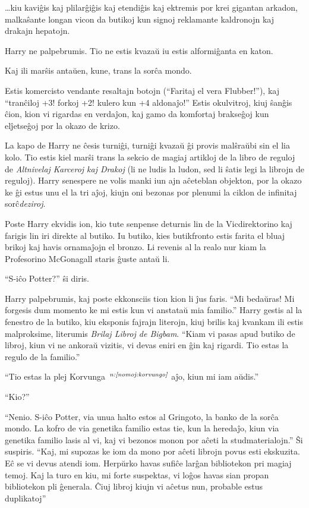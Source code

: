 \ldots kiu kaviĝis kaj plilarĝiĝis kaj etendiĝis kaj ektremis por
krei gigantan arkadon, malkaŝante longan vicon da butikoj kun signoj
reklamante kaldronojn kaj drakajn hepatojn.

Harry ne palpebrumis. Tio ne estis kvazaŭ iu estis alformiĝanta en
katon.

Kaj ili marŝis antaŭen, kune, trans la sorĉa mondo.

Estis komercisto vendante resaltajn botojn (``Faritaj el vera
Flubber!''), kaj ``tranĉiloj +3! forkoj +2! kulero kun +4 aldonaĵo!''
Estis okulvitroj, kiuj ŝanĝis ĉion, kion vi rigardas en verdaĵon, kaj
gamo da komfortaj brakseĝoj kun elĵetseĝoj por la okazo de krizo.

La kapo de Harry ne ĉesis turniĝi, turniĝi kvazaŭ ĝi provis malŝraŭbi
sin el lia kolo. Tio estis kiel marŝi trans la sekcio de magiaj
artikloj de la libro de reguloj de \emph{Altnivelaj Karceroj kaj
Drakoj} (li ne ludis la ludon, sed li ŝatis legi la librojn de
reguloj). Harry senespere ne volis manki iun ajn aĉeteblan objekton,
por la okazo ke ĝi estus unu el la tri aĵoj, kiujn oni bezonas por
plenumi la ciklon de infinitaj sorĉ\emph{deziroj}.

Poste Harry ekvidis ion, kio tute senpense deturnis lin de la
Vicdirektorino kaj farigis lin iri direkte al butiko. Iu butiko, kies
butikfronto estis farita el bluaj brikoj kaj havis ornamaĵojn el
bronzo. Li revenis al la realo nur kiam la Profesorino McGonagall
staris ĝuste antaŭ li.

``S-iĉo Potter?'' ŝi diris.

Harry palpebrumis, kaj poste ekkonsciis tion kion li ĵus faris. ``Mi
bedaŭras!  Mi forgesis dum momento ke mi estis kun vi anstataŭ mia
familio.''  Harry gestis al la fenestro de la butiko, kiu eksponis
fajrajn literojn, kiuj brilis kaj kvankam ili estis malproksime,
literumis \emph{Brilaj Libroj de Bigbam}. ``Kiam vi pasas apud butiko
de libroj, kiun vi ne ankoraŭ vizitis, vi devas eniri en ĝin kaj
rigardi. Tio estas la regulo de la familio.''

``Tio estas la plej Korvunga~$^{\textit{n:\ref{nomoj:korvungo}}}$ aĵo, kiun mi iam aŭdis.''

``Kio?''

``Nenio. S-iĉo Potter, via unua halto estos al Gringoto, la banko de la
sorĉa mondo. La kofro de via genetika familio estas tie, kun la
heredaĵo, kiun via genetika familio lasis al vi, kaj vi bezonos monon
por aĉeti la studmaterialojn.'' Ŝi suspiris. ``Kaj, mi supozas ke iom
da mono por aĉeti librojn povus esti ekskuzita. Eĉ se vi devus atendi
iom. Herpŭrko havas sufiĉe larĝan bibliotekon pri magiaj
temoj. Kaj la turo en kiu, mi forte suspektas, vi loĝos havas sian
propan bibliotekon pli ĝenerala. Ĉiuj libroj kiujn vi aĉetus nun,
probable estus duplikatoj''

